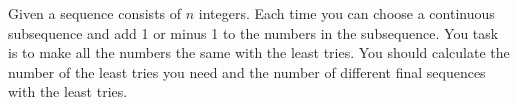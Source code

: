 Given a sequence consists of $n$ integers. Each time you can choose a continuous subsequence and add 1 or minus 1 to the numbers in the subsequence.
You task is to make all the numbers the same with the least tries.
You should calculate the number of the least tries you need and the number of different final sequences with the least tries.
